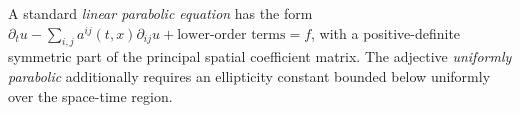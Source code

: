 
A standard \emph{linear parabolic equation} has the form $\partial_tu-\sum_{i,j}a^{ij}(t,x)\partial_{ij}u+\text{lower-order terms}=f$, with a positive-definite symmetric part of the principal spatial coefficient matrix. The adjective \emph{uniformly parabolic} additionally requires an ellipticity constant bounded below uniformly over the space-time region.
